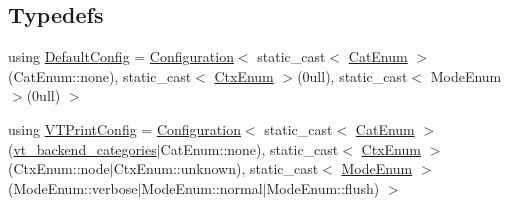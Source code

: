 \subsection*{Typedefs}
\begin{DoxyCompactItemize}
\item 
using \hyperlink{namespacevt_1_1config_a889b68143f3ecf39ea84dadfb9dfda3f}{Default\+Config} = \hyperlink{structvt_1_1config_1_1_configuration}{Configuration}$<$ static\+\_\+cast$<$ \hyperlink{namespacevt_1_1config_a6bd1d6215bda0d8ca02811798399f689}{Cat\+Enum} $>$(Cat\+Enum\+::none), static\+\_\+cast$<$ \hyperlink{namespacevt_1_1config_a46e57c33bee1b9f1fa95455af86d80e0}{Ctx\+Enum} $>$(0ull), static\+\_\+cast$<$ Mode\+Enum $>$(0ull) $>$
\item 
using \hyperlink{namespacevt_1_1config_aea109b59c3cb20cb90200caf8da049b9}{V\+T\+Print\+Config} = \hyperlink{structvt_1_1config_1_1_configuration}{Configuration}$<$ static\+\_\+cast$<$ \hyperlink{namespacevt_1_1config_a6bd1d6215bda0d8ca02811798399f689}{Cat\+Enum} $>$(\hyperlink{debug__masterconfig_8h_a997597a3662694b33e86f6c351c760ff}{vt\+\_\+backend\+\_\+categories}$\vert$Cat\+Enum\+::none), static\+\_\+cast$<$ \hyperlink{namespacevt_1_1config_a46e57c33bee1b9f1fa95455af86d80e0}{Ctx\+Enum} $>$(Ctx\+Enum\+::node$\vert$Ctx\+Enum\+::unknown), static\+\_\+cast$<$ \hyperlink{namespacevt_1_1config_a724e99568632cc0fe9c456c2230270d0}{Mode\+Enum} $>$(Mode\+Enum\+::verbose$\vert$Mode\+Enum\+::normal$\vert$Mode\+Enum\+::flush) $>$
\end{DoxyCompactItemize}
